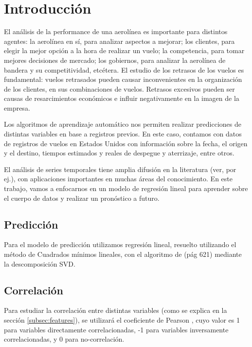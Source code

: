 \section{Introducci\'on}\label{sec:intro}

El an\'alisis de la performance de una aerol\'inea es importante para
distintos agentes: la aerol\'inea en s\'i, para analizar aspectos a
mejorar; los clientes, para elegir la mejor opci\'on a la hora de realizar
un vuelo; la competencia, para tomar mejores decisiones de mercado;
los gobiernos, para analizar la aerol\'inea de bandera y su 
competitividad, etc\'etera. El estudio de los retrasos de los vuelos
es fundamental: vuelos retrasados pueden causar inconvenientes en
la organizaci\'on de los clientes, en sus combinaciones de vuelos.
Retrasos excesivos pueden ser causas de resarcimientos econ\'omicos
e influir negativamente en la imagen de la empresa.

Los algoritmos de aprendizaje autom\'atico nos permiten realizar
predicciones de distintas variables en base a registros previos.
En este caso, contamos con datos de registros de vuelos en Estados Unidos con
informaci\'on sobre la fecha, el origen y el destino, tiempos
estimados y reales de despegue y aterrizaje, entre otros.

El an\'alisis de series temporales tiene amplia difusi\'on en la
literatura (ver\cite{timeseries}, por ej.), con aplicaciones importantes
en muchas \'areas del
conocimiento. En este trabajo, vamos a enfocarnos en un modelo de regresi\'on
lineal para aprender sobre el cuerpo de datos y realizar un pron\'ostico
a futuro.

\subsection{Predicci\'on}\label{subsec:prediction}
Para el modelo de predicci\'on utilizamos regresi\'on lineal\cite{esl},
resuelto utilizando el m\'etodo de Cuadrados m\'inimos lineales, con el algoritmo
de\cite{burden} (p\'ag 621) mediante la descomposici\'on SVD.

\subsection{Correlaci\'on}\label{subsec:correlacion}
Para estudiar la correlaci\'on entre distintas variables (como se explica en la secci\'on \ref{subsec:features}),
se utilizar\'a el coeficiente de Pearson \cite{stats}, cuyo valor es 1 para variables directamente correlacionadas,
-1 para variables inversamente correlacionadas, y 0 para no-correlaci\'on.

